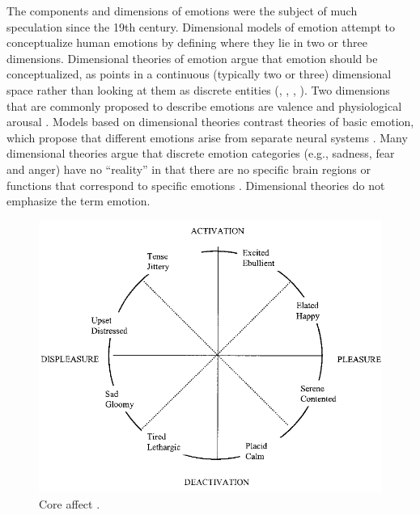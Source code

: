 \documentclass[11pt]{article}
\begin{document}
The components and dimensions of emotions were the subject of much speculation
since the 19th century. Dimensional models of emotion attempt to conceptualize
human emotions by defining where they lie in two or three dimensions.
Dimensional theories of emotion argue that emotion should be conceptualized, as
points in a continuous (typically two or three) dimensional space rather than
looking at them as discrete entities (\cite{carver:affect-behavior},
\cite{mehrabian-russell:pad}, \cite{russell:core-affect},
\cite{watson:consensual-structure-mood}). Two dimensions that are commonly
proposed to describe emotions are valence and physiological arousal
\cite{arnold:emotion-personality} \cite{lazarus:cognitive-theory-emotion}
\cite{russell:circumplex-affect}. Models based on dimensional theories contrast
theories of basic emotion, which propose that different emotions arise from
separate neural systems \cite{posner:circumplex-affect}. Many dimensional
theories argue that discrete emotion categories (e.g., sadness, fear and anger)
have no ``reality'' in that there are no specific brain regions or functions
that correspond to specific emotions \cite{barrett:emotions-natural}.
Dimensional theories do not emphasize the term emotion.

\begin{figure}[tbh]
  \center
  \includegraphics[width=.7\textwidth]{figure/core-affect.png}
  \caption{Core affect \cite{russell:core-affect}.}
  \label{fig:core-affect}
\end{figure}
\end{document}
